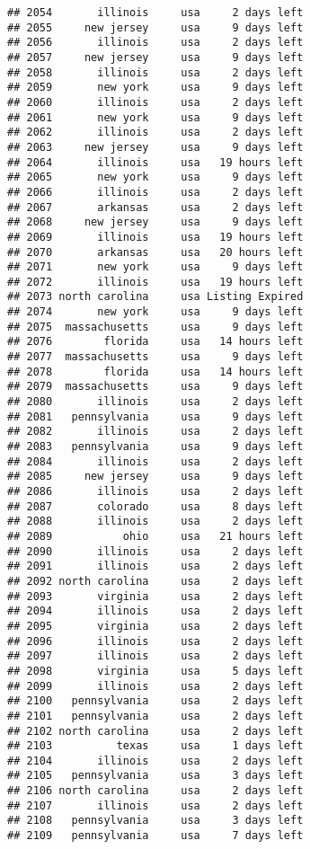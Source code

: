 \documentclass[
]{article}
\begin{document}
\begin{verbatim}
## 2054       illinois     usa     2 days left
## 2055     new jersey     usa     9 days left
## 2056       illinois     usa     2 days left
## 2057     new jersey     usa     9 days left
## 2058       illinois     usa     2 days left
## 2059       new york     usa     9 days left
## 2060       illinois     usa     2 days left
## 2061       new york     usa     9 days left
## 2062       illinois     usa     2 days left
## 2063     new jersey     usa     9 days left
## 2064       illinois     usa   19 hours left
## 2065       new york     usa     9 days left
## 2066       illinois     usa     2 days left
## 2067       arkansas     usa     2 days left
## 2068     new jersey     usa     9 days left
## 2069       illinois     usa   19 hours left
## 2070       arkansas     usa   20 hours left
## 2071       new york     usa     9 days left
## 2072       illinois     usa   19 hours left
## 2073 north carolina     usa Listing Expired
## 2074       new york     usa     9 days left
## 2075  massachusetts     usa     9 days left
## 2076        florida     usa   14 hours left
## 2077  massachusetts     usa     9 days left
## 2078        florida     usa   14 hours left
## 2079  massachusetts     usa     9 days left
## 2080       illinois     usa     2 days left
## 2081   pennsylvania     usa     9 days left
## 2082       illinois     usa     2 days left
## 2083   pennsylvania     usa     9 days left
## 2084       illinois     usa     2 days left
## 2085     new jersey     usa     9 days left
## 2086       illinois     usa     2 days left
## 2087       colorado     usa     8 days left
## 2088       illinois     usa     2 days left
## 2089           ohio     usa   21 hours left
## 2090       illinois     usa     2 days left
## 2091       illinois     usa     2 days left
## 2092 north carolina     usa     2 days left
## 2093       virginia     usa     2 days left
## 2094       illinois     usa     2 days left
## 2095       virginia     usa     2 days left
## 2096       illinois     usa     2 days left
## 2097       illinois     usa     2 days left
## 2098       virginia     usa     5 days left
## 2099       illinois     usa     2 days left
## 2100   pennsylvania     usa     2 days left
## 2101   pennsylvania     usa     2 days left
## 2102 north carolina     usa     2 days left
## 2103          texas     usa     1 days left
## 2104       illinois     usa     2 days left
## 2105   pennsylvania     usa     3 days left
## 2106 north carolina     usa     2 days left
## 2107       illinois     usa     2 days left
## 2108   pennsylvania     usa     3 days left
## 2109   pennsylvania     usa     7 days left

\end{verbatim}
\end{document}
